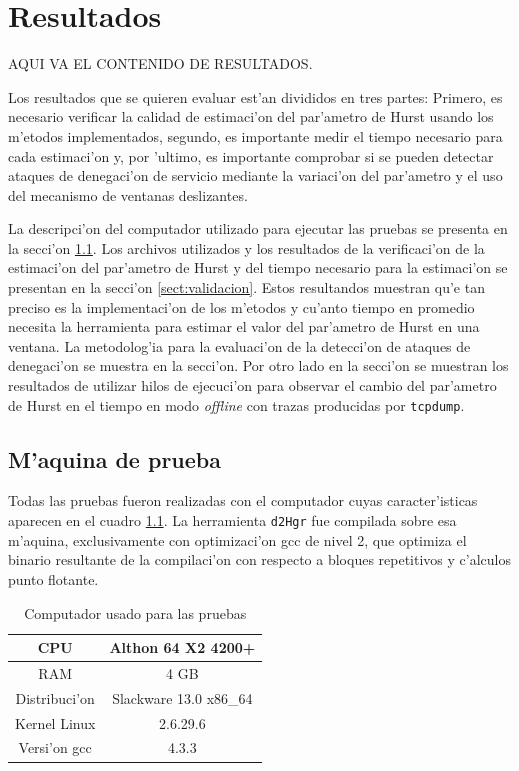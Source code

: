 \chapter{Resultados} \label{chap:resultados}

AQUI VA EL CONTENIDO DE RESULTADOS.
\vspace{5 mm}

Los resultados que se quieren evaluar est'an divididos en tres partes: 
Primero, es necesario verificar la calidad de estimaci'on del par'ametro
de Hurst usando los m'etodos implementados, segundo, es importante medir 
el tiempo necesario para cada estimaci'on y, por 'ultimo, es importante
comprobar si se pueden detectar ataques de denegaci'on de servicio mediante la
variaci'on del par'ametro y el uso del mecanismo de ventanas deslizantes.

La descripci'on del computador utilizado para ejecutar las pruebas se 
presenta en la secci'on \ref{sect:testbed}. Los archivos utilizados y los
resultados de la verificaci'on de la estimaci'on del par'ametro de Hurst y del
tiempo necesario para la estimaci'on se presentan en la secci'on
\ref{sect:validacion}. Estos resultandos muestran qu'e tan
preciso es la implementaci'on de los m'etodos y cu'anto tiempo en promedio
necesita la herramienta para estimar el valor del par'ametro de Hurst en una
ventana. La metodolog'ia para la evaluaci'on de la detecci'on de ataques de
denegaci'on se muestra en la secci'on. Por otro lado en
la secci'on se muestran los resultados de utilizar hilos de ejecuci'on 
para observar el cambio del par'ametro de Hurst en el tiempo en modo {\it offline} 
con trazas producidas por {\tt tcpdump}.

\section{M'aquina de prueba} \label{sect:testbed}

Todas las pruebas fueron realizadas con el computador cuyas caracter'isticas
aparecen en el cuadro \ref{tb:testbed}. La herramienta {\tt d2Hgr} fue
compilada sobre esa m'aquina, exclusivamente con optimizaci'on gcc de nivel 2,
que optimiza el binario resultante de la compilaci'on con respecto a bloques
repetitivos y c'alculos punto flotante.

\begin{table}[htb]
\footnotesize
\begin{center}
\begin{tabular}{|>{\columncolor{lightgray}}c|c|}
\hline
CPU & Althon 64 X2 4200+ \\
\hline
RAM & 4 GB \\
\hline
Distribuci'on & Slackware 13.0 x86\_64 \\
\hline
Kernel Linux & 2.6.29.6 \\
\hline
Versi'on gcc & 4.3.3 \\
\hline
\end{tabular}
\caption{Computador usado para las pruebas}
\label{tb:testbed}
\end{center}
\end{table}

